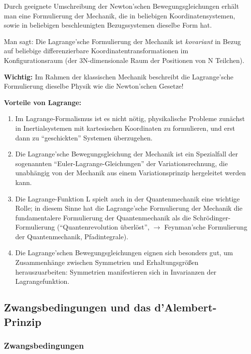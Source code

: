 \documentclass[10pt, letterpaper]{article}
\begin{document}
Durch geeignete Umschreibung der Newton'schen Bewegungsgleichungen erhält man eine Formulierung der Mechanik, die in beliebigen Koordinatensystemen, sowie in beliebigen beschleunigten Bezugssystemen dieselbe Form hat.

Man sagt: Die Lagrange'sche Formulierung der Mechanik ist \emph{kovariant} in Bezug auf beliebige differenzierbare Koordinatentransformationen im Konfigurationsraum (der 3N-dimensionale Raum der Positionen von N Teilchen).

\textbf{Wichtig:} Im Rahmen der klassischen Mechanik beschreibt die Lagrange'sche Formulierung dieselbe Physik wie die Newton'schen Gesetze!

\textbf{Vorteile von Lagrange:}

\begin{enumerate}
\item Im Lagrange-Formalismus ist es nicht nötig, physikalische Probleme zunächst in Inertialsystemen mit kartesischen Koordinaten zu formulieren, und erst dann zu ``geschickten'' Systemen überzugehen.

\item Die Lagrange'sche Bewegungsgleichung der Mechanik ist ein Spezialfall der sogenannten ``Euler-Lagrange-Gleichungen'' der Variationsrechnung, die unabhängig von der Mechanik aus einem Variationsprinzip hergeleitet werden kann.

\item Die Lagrange-Funktion L spielt auch in der Quantenmechanik eine wichtige Rolle; in diesem Sinne hat die Lagrange'sche Formulierung der Mechanik die
fundamentalere Formulierung der Quantenmechanik als die Schrödinger-Formulierung (``Quantenrevolution überlöst'', $\to$ Feynman'sche Formulierung der Quantenmechanik, Pfadintegrale).

\item Die Lagrange'schen Bewegungsgleichungen eignen sich besonders gut, um Zusammenhänge zwischen Symmetrien und Erhaltungsgrößen herauszuarbeiten: Symmetrien manifestieren sich in Invarianzen der Lagrangefunktion.
\end{enumerate}



\subsection{Zwangsbedingungen und das d'Alembert-Prinzip}

\subsubsection{Zwangsbedingungen}
\end{document}
